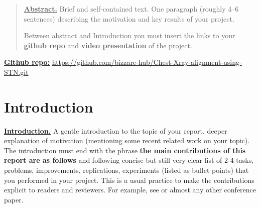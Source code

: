 \documentclass{article}
\begin{document}
\printAffiliationsAndNotice{}  %
\begin{abstract}

\underline{\textbf{Abstract.}} Brief and self-contained text. One paragraph (roughly 4--6 sentences) describing the motivation and key results of your project. 

Between abstract and Introduction you must insert the links to your \textbf{github repo} and \textbf{video presentation} of the project.

\end{abstract}

\underline{\textbf{Github repo:}} \href{https://github.com/bizzare-hub/Chest-Xray-alignment-using-STN.git}{https://github.com/bizzare-hub/Chest-Xray-alignment-using-STN.git}\newline

\section{Introduction}\label{introduction}

\underline{\textbf{Introduction.}} A gentle introduction to the topic of your report, deeper explanation of motivation (mentioning some recent related work on your topic). The introduction must end with the phrase \textbf{the main contributions of this report are as follows} and following concise but still very clear list of 2-4 tasks, problems, improvements, replications, experiments (listed as bullet points) that you performed in your project. This is a usual practice to make the contributions explicit to readers and reviewers. For example, see \cite{arjovsky2017wasserstein,NIPS20198433} or almost any other conference paper.
\end{document}
